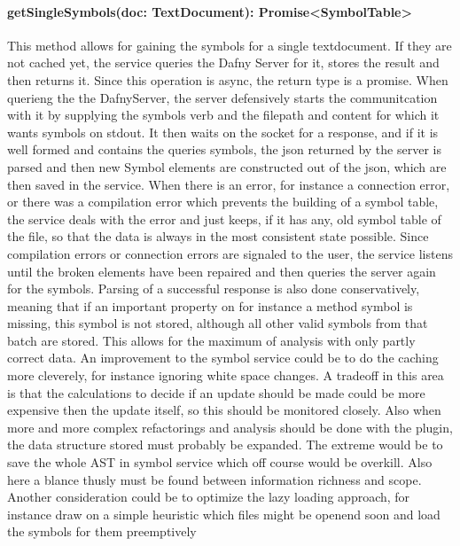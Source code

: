 \paragraph{getSingleSymbols(doc: TextDocument): Promise<SymbolTable>} This method allows for gaining the symbols for a single textdocument. If they are not cached yet, the service queries the Dafny Server for it, stores the result and then returns it. Since this operation is async, the return type is a promise.
\newline
When querieng the the DafnyServer, the server defensively starts the communitcation with it by supplying the symbols verb and the filepath and content for which it wants symbols on stdout. It then waits on the socket for a response, and if it is well formed and contains the queries symbols, the json returned by the server is parsed and then new Symbol elements are constructed out of the json, which are then saved in the service. \newline
When there is an error, for instance a connection error, or there was a compilation error which prevents the building of a symbol table, the service deals with the error and just keeps, if it has any, old symbol table of the file, so that the data is always in the most consistent state possible. Since compilation errors or connection errors are signaled to the user, the service listens until the broken elements have been repaired and then queries the server again for the symbols. \newline
Parsing of a successful response is also done conservatively, meaning that if an important property on for instance a method symbol is missing, this symbol is not stored, although all other valid symbols from that batch are stored. This allows for the maximum of analysis with only partly correct data. \newline
An improvement to the symbol service could be to do the caching more cleverely, for instance ignoring white space changes. A tradeoff in this area is that the calculations to decide if an update should be made could be more expensive then the update itself, so this should be monitored closely. Also when more and more complex refactorings and analysis should be done with the plugin, the data structure stored must probably be expanded. The extreme would be to save the whole AST in symbol service which off course would be overkill. Also here a blance thusly must be found between information richness and scope. Another consideration could be to optimize the lazy loading approach, for instance draw on a simple heuristic which files might be openend soon and load the symbols for them preemptively\newline
